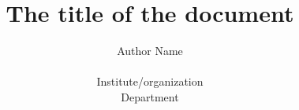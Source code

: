 \documentclass[a4paper]{report}
\title{
	\Huge{
		The title of the document
	}
}
\author{
	Author Name \\
	\\
	\normalsize{Institute/organization} \\
	\normalsize{Department}
}
\begin{document}
\maketitle
\thispagestyle{empty}
\newpage

\begin{abstract}
%
\end{abstract}

\tableofcontents
\newpage






\appendix
\end{document}
